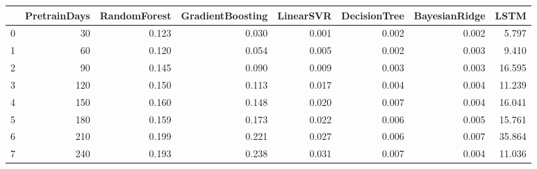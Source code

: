 \begin{tabular}{lrrrrrrr}
\toprule
{} &  PretrainDays &  RandomForest &  GradientBoosting &  LinearSVR &  DecisionTree &  BayesianRidge &   LSTM \\
\midrule
0 &            30 &         0.123 &             0.030 &      0.001 &         0.002 &          0.002 &  5.797 \\
1 &            60 &         0.120 &             0.054 &      0.005 &         0.002 &          0.003 &  9.410 \\
2 &            90 &         0.145 &             0.090 &      0.009 &         0.003 &          0.003 & 16.595 \\
3 &           120 &         0.150 &             0.113 &      0.017 &         0.004 &          0.004 & 11.239 \\
4 &           150 &         0.160 &             0.148 &      0.020 &         0.007 &          0.004 & 16.041 \\
5 &           180 &         0.159 &             0.173 &      0.022 &         0.006 &          0.005 & 15.761 \\
6 &           210 &         0.199 &             0.221 &      0.027 &         0.006 &          0.007 & 35.864 \\
7 &           240 &         0.193 &             0.238 &      0.031 &         0.007 &          0.004 & 11.036 \\
\bottomrule
\end{tabular}
